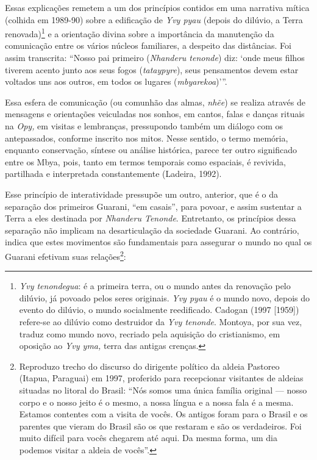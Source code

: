 Essas explicações remetem a um dos princípios contidos em uma narrativa
mítica (colhida em 1989-90) sobre a edificação de \emph{Yvy pyau}
(depois do dilúvio, a Terra renovada)\footnote{\emph{Yvy tenondegua}: é
  a primeira terra, ou o mundo antes da renovação pelo dilúvio, já
  povoado pelos seres originais. \emph{Yvy pyau} é o mundo novo, depois
  do evento do dilúvio, o mundo socialmente reedificado. Cadogan (1997
  {[}1959{]}) refere-se ao dilúvio como destruidor da \emph{Yvy
  tenonde}. Montoya, por sua vez, traduz como mundo novo, recriado pela
  aquisição do cristianismo, em oposição ao \emph{Yvy yma,} terra das
  antigas crenças.} e a orientação divina sobre a importância da
manutenção da comunicação entre os vários núcleos familiares, a despeito
das distâncias. Foi assim transcrita: ``Nosso pai primeiro
(\emph{Nhanderu tenonde}) diz: `onde meus filhos tiverem acento junto
aos seus fogos (\emph{tataypyre}), seus pensamentos devem estar voltados
uns aos outros, em todos os lugares (\emph{mbyarekoa})'''.

Essa esfera de comunicação (ou comunhão das almas, \emph{nhẽe}) se
realiza através de mensagens e orientações veiculadas nos sonhos, em
cantos, falas e danças rituais na \emph{Opy,} em visitas e lembranças,
pressupondo também um diálogo com os antepassados, conforme inscrito nos
mitos. Nesse sentido, o termo memória, enquanto conservação, síntese ou
análise histórica, parece ter outro significado entre os Mbya, pois,
tanto em termos temporais como espaciais, é revivida, partilhada e
interpretada constantemente (Ladeira, 1992).

Esse princípio de interatividade pressupõe um outro, anterior, que é o
da separação dos primeiros Guarani, ``em casais'', para povoar, e assim
sustentar a Terra a eles destinada por \emph{Nhanderu Tenonde}.
Entretanto, os princípios dessa separação não implicam na desarticulação
da sociedade Guarani. Ao contrário, indica que estes movimentos são
fundamentais para assegurar o mundo no qual os Guarani efetivam suas
relações\footnote{Reproduzo trecho do discurso do dirigente político da
  aldeia Pastoreo (Itapua, Paraguai) em 1997, proferido para recepcionar
  visitantes de aldeias situadas no litoral do Brasil: ``Nós somos uma
  única família original --- nosso corpo e o nosso jeito é o mesmo, a
  nossa língua e a nossa fala é a mesma. Estamos contentes com a visita
  de vocês. Os antigos foram para o Brasil e os parentes que vieram do
  Brasil são os que restaram e são os verdadeiros. Foi muito difícil
  para vocês chegarem até aqui. Da mesma forma, um dia podemos visitar a
  aldeia de vocês''.}:

